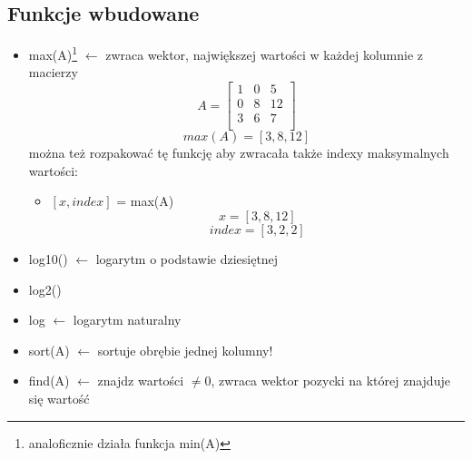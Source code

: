 \documentclass[16pt]{article}
\begin{document}
        \subsection*{Funkcje wbudowane}
            \begin{itemize}
                \item max(A)\footnote{analoficznie działa funkcja min(A)} $\leftarrow$ zwraca wektor, największej wartości w każdej kolumnie z macierzy
                \begin{equation*}
                    A =\begin{bmatrix}
                        1 & 0 & 5\\
                        0 & 8 & 12\\
                        3 & 6 & 7\\ 
                    \end{bmatrix}
                \end{equation*}
                \begin{equation*}
                    max(A) = [3, 8, 12]
                \end{equation*}
                można też rozpakować tę funkcję aby zwracała także indexy maksymalnych wartości:
                \begin{itemize}
                    \item $[x, index]$ = max(A)
                    \begin{equation*}
                        x = [3, 8, 12]
                    \end{equation*}
                    \begin{equation*}
                        index = [3, 2, 2]
                    \end{equation*}
                \end{itemize}
                \item log10() $\leftarrow$ logarytm o podstawie dziesiętnej
                \item log2()
                \item log $\leftarrow$ logarytm naturalny
                \item sort(A) $\leftarrow$ sortuje obrębie jednej kolumny!
                \item find(A) $\leftarrow$ znajdz wartości $\neq 0$, zwraca wektor pozycki na której znajduje się wartość
            \end{itemize}
\end{document}
